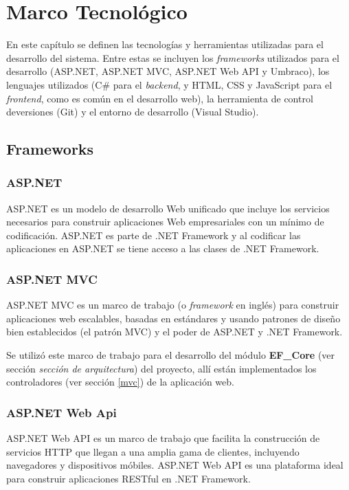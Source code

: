 \chapter{Marco Tecnológico}
En este capítulo se definen las tecnologías y herramientas utilizadas para el desarrollo del sistema. Entre estas se incluyen los \textit{frameworks} utilizados para el desarrollo (ASP.NET, ASP.NET MVC, ASP.NET Web API y Umbraco), los lenguajes utilizados (C\# para el \textit{backend}, y HTML, CSS y JavaScript para el \textit{frontend}, como es común en el desarrollo web), la herramienta de control deversiones (Git) y el entorno de desarrollo (Visual Studio).

\section{Frameworks}
    \subsection{ASP.NET}
    ASP.NET es un modelo de desarrollo Web unificado que incluye los servicios necesarios para construir aplicaciones Web empresariales con un mínimo de codificación. ASP.NET es parte de .NET Framework y al codificar las aplicaciones en ASP.NET se tiene acceso a las clases de .NET Framework. \cite{asp.netMicrosoft}

    \subsection{ASP.NET MVC}
    ASP.NET MVC es un marco de trabajo (o \textit{framework} en inglés) para construir aplicaciones web escalables, basadas en estándares y usando patrones de diseño bien establecidos (el patrón MVC) y el poder de ASP.NET y .NET Framework. \cite{asp.netMVCMicrosoft}

    Se utilizó este marco de trabajo para el desarrollo del módulo \textbf{EF\_Core} (ver sección \emph{sección de arquitectura}) del proyecto, allí están implementados los controladores (ver sección \ref{mvc}) de la aplicación web.

    \subsection{ASP.NET Web Api}
    ASP.NET Web API es un marco de trabajo que facilita la construcción de servicios HTTP que llegan a una amplia gama de clientes, incluyendo navegadores y dispositivos móbiles. ASP.NET Web API es una plataforma ideal para construir aplicaciones RESTful en .NET Framework. \cite{asp.netWebAPIMicrosoft}

